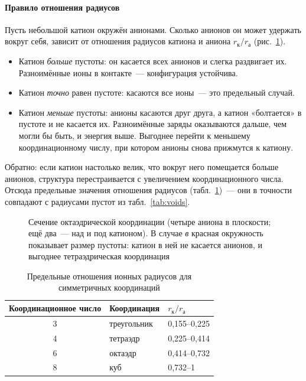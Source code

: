 \paragraph{Правило отношения радиусов}
Пусть небольшой катион окружён анионами. Сколько анионов он может
удержать вокруг себя, зависит от отношения радиусов катиона и аниона
$r_\text{к}/r_\text{а}$ (рис.~\ref{fig:radius-ratio}).
\begin{itemize}
\item Катион \emph{больше} пустоты: он касается всех анионов и слегка
раздвигает их. Разноимённые ионы в контакте~— конфигурация устойчива.
\item Катион \emph{точно} равен пустоте: касаются все ионы~— это
предельный случай.
\item Катион \emph{меньше} пустоты: анионы касаются друг друга, а катион
«болтается» в пустоте и не касается их. Разноимённые заряды оказываются
дальше, чем могли бы быть, и энергия выше. Выгоднее перейти к меньшему
координационному числу, при котором анионы снова прижмутся к катиону.
\end{itemize}
Обратно: если катион настолько велик, что вокруг него помещается больше
анионов, структура перестраивается с увеличением координационного числа.
Отсюда предельные значения отношения радиусов
(табл.~\ref{tab:radius-ratio})~— они в точности совпадают с радиусами
пустот из табл.~\ref{tab:voids}.

\begin{figure}[ht]
\centering
{}
\caption{Сечение октаэдрической координации (четыре аниона в плоскости;
ещё два~— над и под катионом). В случае \textit{в} красная окружность
показывает размер пустоты: катион в ней не касается анионов, и выгоднее
тетраэдрическая координация}
\label{fig:radius-ratio}
\end{figure}

\begin{table}[ht]
\centering
\caption{Предельные отношения ионных радиусов для симметричных координаций}
\label{tab:radius-ratio}
\small
\begin{tabular}{@{}cll@{}}
\toprule
Координационное число & Координация & $r_\text{к}/r_\text{а}$ \\
\midrule
3 & треугольник & 0,155--0,225 \\
4 & тетраэдр & 0,225--0,414 \\
6 & октаэдр & 0,414--0,732 \\
8 & куб & 0,732--1 \\
\bottomrule
\end{tabular}
\end{table}

